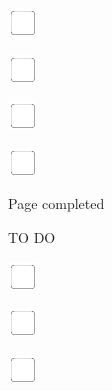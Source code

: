 \documentclass[11pt,titlepage]{article}
\begin{document}
\vspace{10mm}

\noindent
\includegraphics[]{checkbox-4mm.pdf}

\vspace{10mm}

\noindent
\includegraphics[]{checkbox-4mm.pdf}

\vspace{10mm}

\noindent
\includegraphics[]{checkbox-4mm.pdf}

\vspace{10mm}

\noindent
\includegraphics[]{checkbox-4mm.pdf}

\vspace{4mm}

\hfill Page completed \hspace{20mm}

\pagebreak

\small
\hfill TO DO

\vspace{6mm}

\noindent
\includegraphics[]{checkbox-4mm.pdf}

\vspace{10mm}

\noindent
\includegraphics[]{checkbox-4mm.pdf}

\vspace{10mm}

\noindent
\includegraphics[]{checkbox-4mm.pdf}
\end{document}
